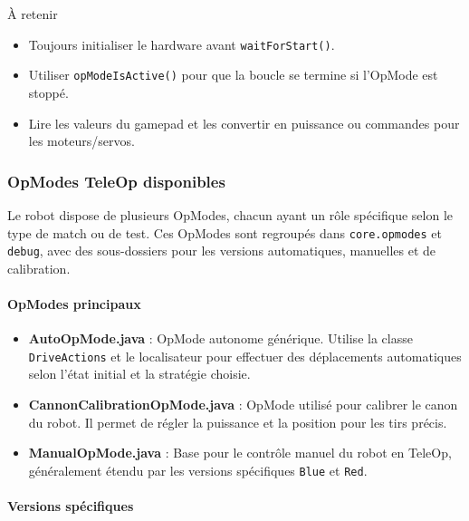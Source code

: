 \documentclass[12pt, a4paper]{report}
\begin{document}
    \begin{myinfo}{À retenir}
        \begin{itemize}
            \item Toujours initialiser le hardware avant \texttt{waitForStart()}.
            \item Utiliser \texttt{opModeIsActive()} pour que la boucle se termine si l'OpMode est stoppé.
            \item Lire les valeurs du gamepad et les convertir en puissance ou commandes pour les moteurs/servos.
        \end{itemize}
    \end{myinfo}

    \subsubsection*{OpModes TeleOp disponibles}

    Le robot dispose de plusieurs OpModes, chacun ayant un rôle spécifique selon le type de match ou de test. Ces OpModes sont regroupés dans \texttt{core.opmodes} et \texttt{debug}, avec des sous-dossiers pour les versions automatiques, manuelles et de calibration.


    \paragraph{OpModes principaux}

    \begin{itemize}
        \item \textbf{AutoOpMode.java} : OpMode autonome générique. Utilise la classe \texttt{DriveActions} et le localisateur pour effectuer des déplacements automatiques selon l'état initial et la stratégie choisie.

        \item \textbf{CannonCalibrationOpMode.java} : OpMode utilisé pour calibrer le canon du robot. Il permet de régler la puissance et la position pour les tirs précis.

        \item \textbf{ManualOpMode.java} : Base pour le contrôle manuel du robot en TeleOp, généralement étendu par les versions spécifiques \texttt{Blue} et \texttt{Red}.
    \end{itemize}

    \paragraph{Versions spécifiques}
\end{document}
